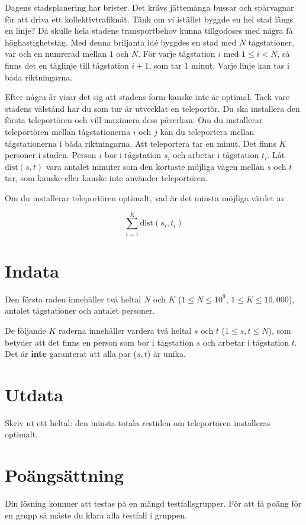 
Dagens stadsplanering har brister.
Det krävs jättemånga bussar och spårvagnar för att driva ett kollektivtrafiknät.
Tänk om vi istället byggde en hel stad längs en linje?
Då skulle hela stadens transportbehov kunna tillgodoses med några få höghastighetståg.
Med denna briljanta idé byggdes en stad med $N$ tågstationer, var och en numrerad mellan $1$ och $N$.
För varje tågstation $i$ med $1 \leq i < N$, så finns det en tåglinje till tågstation $i+1$, som tar $1$ minut.
Varje linje kan tas i båda riktningarna.

Efter några år visar det sig att stadens form kanske inte är optimal.
Tack vare stadens välstånd har du som tur är utvecklat en teleportör.
Du ska installera den första teleportören och vill maximera dess påverkan.
Om du installerar teleportören mellan tågstationerna $i$ och $j$ kan du teleportera mellan tågstationerna i båda riktningarna.
Att teleportera tar en minut.
Det finns $K$ personer i staden.
Person $i$ bor i tågstation $s_i$ och arbetar i tågstation $t_i$.
Låt $\text{dist}(s,t)$ vara antalet minuter som den kortaste möjliga vägen mellan $s$ och $t$ tar,
som kanske eller kanske inte använder teleportören.

Om du installerar teleportören optimalt, vad är det minsta möjliga värdet av

$$\sum_{i=1}^{K} \text{dist}(s_i, t_i)$$

\section*{Indata}

Den första raden innehåller två heltal $N$ och $K$ ($1 \leq N \leq 10^9$, $1 \leq K \leq 10{,}000$),
antalet tågstationer och antalet personer.

De följande $K$ raderna innehåller vardera två heltal $s$ och $t$ ($1 \leq s,t \leq N$),
som betyder att det finns en person som bor i tågstation $s$ och arbetar i tågstation $t$.
Det är \textbf{inte} garanterat att alla par ($s,t$) är unika.

\section*{Utdata}
Skriv ut ett heltal: den minsta totala restiden om teleportören installeras optimalt.

\section*{Poängsättning}
Din lösning kommer att testas på en mängd testfallsgrupper.
För att få poäng för en grupp så måste du klara alla testfall i gruppen.

